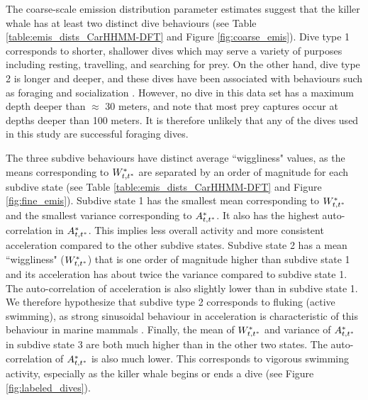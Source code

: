 The coarse-scale emission distribution parameter estimates suggest that the killer whale has at least two distinct dive behaviours (see Table \ref{table:emis_dists_CarHHMM-DFT} and Figure \ref{fig:coarse_emis}). 
Dive type 1 corresponds to shorter, shallower dives which may serve a variety of purposes including resting, travelling, and searching for prey.
On the other hand, dive type 2 is longer and deeper, and these dives have been associated with behaviours such as foraging and socialization \citep{Tennessen:2019b}. However, no dive in this data set has a maximum depth deeper than $\approx$ 30 meters, and \citet{Wright:2017} note that most prey captures occur at depths deeper than 100 meters. It is therefore unlikely that any of the dives used in this study are successful foraging dives.

The three subdive behaviours have distinct average ``wiggliness" values, as the means corresponding to $W^*_{t,t^*}$ are separated by an order of magnitude for each subdive state (see Table \ref{table:emis_dists_CarHHMM-DFT} and Figure \ref{fig:fine_emis}). 
Subdive state 1 has the smallest mean corresponding to $W^*_{t,t^*}$ and the smallest variance corresponding to $A^*_{t,t^*}$. It also has the highest auto-correlation in $A^*_{t,t^*}$. This implies less overall activity and more consistent acceleration compared to the other subdive states. 
Subdive state 2 has a mean ``wiggliness" ($W^*_{t,t^*}$) that is one order of magnitude higher than subdive state 1 and its acceleration has about twice the variance compared to subdive state 1. The auto-correlation of acceleration is also slightly lower than in subdive state 1. We therefore hypothesize that subdive type 2 corresponds to fluking (active swimming), as strong sinusoidal behaviour in acceleration is characteristic of this behaviour in marine mammals \citep{Simon:2012}.
Finally, the mean of $W^*_{t,t^*}$ and variance of $A^*_{t,t^*}$ in subdive state 3 are both much higher than in the other two states. The auto-correlation of $A^*_{t,t^*}$ is also much lower. This corresponds to vigorous swimming activity, especially as the killer whale begins or ends a dive (see Figure \ref{fig:labeled_dives}). 

